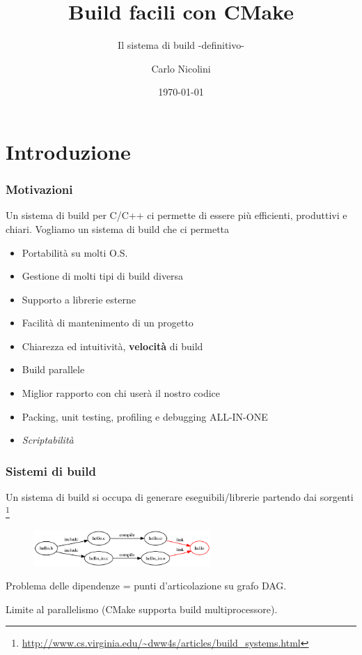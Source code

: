 \documentclass[10pt] {beamer}
\title{Build facili con CMake}
\subtitle{Il sistema di build -definitivo-}
\author{Carlo Nicolini}
\date{\today}
\begin{document}
\frame{\titlepage}


\section{Introduzione}
\begin{frame}
\frametitle{Motivazioni}
Un sistema di build per C/C++ ci permette di essere più efficienti, produttivi e chiari.
Vogliamo un sistema di build che ci permetta
\begin{itemize}
\item<1-> Portabilità su molti O.S.
\item<2-> Gestione di molti tipi di build diversa
\item<3-> Supporto a librerie esterne
\item<4-> Facilità di mantenimento di un progetto
\item<5-> Chiarezza ed intuitività, \textbf{velocità} di build
\item<6-> Build parallele
\item<7-> Miglior rapporto con chi userà il nostro codice
\item<8-> Packing, unit testing, profiling e debugging ALL-IN-ONE
\item<9-> \emph{Scriptabilità}
\end{itemize}
\end{frame}

\begin{frame}
\frametitle{Sistemi di build}
Un sistema di build si occupa di generare eseguibili/librerie partendo dai sorgenti \footnote{\url{http://www.cs.virginia.edu/~dww4s/articles/build_systems.html}}
\begin{figure}[htb]
 \centering
 \includegraphics[width=0.6\textwidth]{images/hello_digraph.png}
\end{figure}
Problema delle dipendenze = punti d'articolazione su grafo DAG.

Limite al parallelismo (CMake supporta build multiprocessore).
\end{frame}
\end{document}
